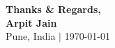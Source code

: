 \vspace{20pt}
\begin{flushright}
\small
\textbf{Thanks \& Regards,}\\[2pt]
\textbf{Arpit Jain}\\[2pt]
Pune, India $|$ \today
\end{flushright}